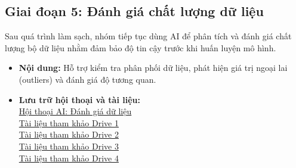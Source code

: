 \documentclass[12pt, a4paper]{article}
\begin{document}
\subsection{Giai đoạn 5: Đánh giá chất lượng dữ liệu}
Sau quá trình làm sạch, nhóm tiếp tục dùng AI để phân tích và đánh giá chất lượng bộ dữ liệu nhằm đảm bảo độ tin cậy trước khi huấn luyện mô hình.
\begin{itemize}[label=$\bullet$]
    \item \textbf{Nội dung:} Hỗ trợ kiểm tra phân phối dữ liệu, phát hiện giá trị ngoại lai (outliers) và đánh giá độ tương quan.
    \item \textbf{Lưu trữ hội thoại và tài liệu:} \\
    \href{https://aistudio.google.com/app/prompts?state=%7B%22ids%22:%5B%2212WFRMwd4BoCS2eN5WYQ5Y4TeBpgV_VeJ%22%5D,%22action%22:%22open%22,%22userId%22:%22109749123592071518780%22,%22resourceKeys%22:%7B%7D%7D&usp=sharing}{Hội thoại AI: Đánh giá dữ liệu} \\
    \href{https://drive.google.com/file/d/10XBrYX5VhHheaSV36f1C0WM7nzQdZhfB/view?usp=sharing}{Tài liệu tham khảo Drive 1} \\
    \href{https://drive.google.com/file/d/1WgmiUA2mkSW_j5tGj0uIrkTO-sELDYed/view?usp=sharing}{Tài liệu tham khảo Drive 2} \\
    \href{https://drive.google.com/file/d/1XBRWLMsrBC8lrHHF6LY2scjHNSIw1SKV/view?usp=sharing}{Tài liệu tham khảo Drive 3} \\
    \href{https://drive.google.com/file/d/1kl2oSOldfTz_SNZbH7-6QO20euFVtkyt/view?usp=sharing}{Tài liệu tham khảo Drive 4}
\end{itemize}
\end{document}
